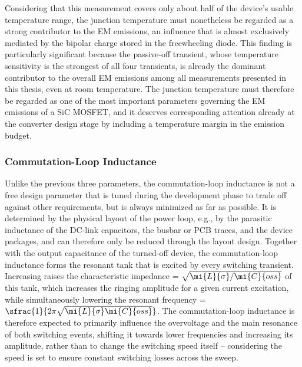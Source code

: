 Considering that this measurement covers only about half of the device's usable temperature range, the junction temperature must nonetheless be regarded as a strong contributor to the EM emissions, an influence that is almost exclusively mediated by the bipolar charge stored in the freewheeling diode.
This finding is particularly significant because the passive-off transient, whose temperature sensitivity is the strongest of all four transients, is already the dominant contributor to the overall EM emissions among all measurements presented in this thesis, even at room temperature.
The junction temperature must therefore be regarded as one of the most important parameters governing the EM emissions of a SiC MOSFET, and it deserves corresponding attention already at the converter design stage by including a temperature margin in the emission budget.

\FloatBarrier

\subsubsection*{Commutation-Loop Inductance}

Unlike the previous three parameters, the commutation-loop inductance  is not a free design parameter that is tuned during the development phase to trade off against other requirements, but is always minimized as far as possible. 
It is determined by the physical layout of the power loop, e.g., by the parasitic inductance of the DC-link capacitors, the busbar or PCB traces, and the device packages, and can therefore only be reduced through the layout design.
Together with the output capacitance  of the turned-off device, the commutation-loop inductance forms the resonant tank that is excited by every switching transient.
Increasing  raises the characteristic impedance  = \(\sqrt{\mi{L}{\sigma}/\mi{C}{oss}}\) of this tank, which increases the ringing amplitude for a given current excitation, while simultaneously lowering the resonant frequency  = $\sfrac{1}{2\pi\sqrt{\mi{L}{\sigma}\mi{C}{oss}}}$.
The commutation-loop inductance is therefore expected to primarily influence the overvoltage and the main resonance of both switching events, shifting it towards lower frequencies and increasing its amplitude, rather than to change the switching speed itself -- considering the speed is set to ensure constant switching losses across the sweep.

